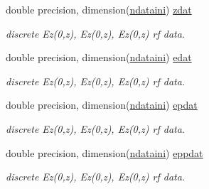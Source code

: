 \textbf{ }\par
\begin{DoxyCompactItemize}
\item 
double precision, dimension(\mbox{\hyperlink{namespacedataclass_a2578bbe9c4dc0892ee08a8619cd7e978}{ndataini}}) \mbox{\hyperlink{namespacedataclass_aeed47a37719b1f84d885a1cb8a962081}{zdat}}
\begin{DoxyCompactList}\small\item\em discrete Ez(0,z), Ez\textquotesingle{}(0,z), Ez\textquotesingle{}\textquotesingle{}(0,z) rf data. \end{DoxyCompactList}\item 
double precision, dimension(\mbox{\hyperlink{namespacedataclass_a2578bbe9c4dc0892ee08a8619cd7e978}{ndataini}}) \mbox{\hyperlink{namespacedataclass_a67357b933079ed021a94705c576fead0}{edat}}
\begin{DoxyCompactList}\small\item\em discrete Ez(0,z), Ez\textquotesingle{}(0,z), Ez\textquotesingle{}\textquotesingle{}(0,z) rf data. \end{DoxyCompactList}\item 
double precision, dimension(\mbox{\hyperlink{namespacedataclass_a2578bbe9c4dc0892ee08a8619cd7e978}{ndataini}}) \mbox{\hyperlink{namespacedataclass_a2f77b697b14f3e0d557f044ea69402d8}{epdat}}
\begin{DoxyCompactList}\small\item\em discrete Ez(0,z), Ez\textquotesingle{}(0,z), Ez\textquotesingle{}\textquotesingle{}(0,z) rf data. \end{DoxyCompactList}\item 
double precision, dimension(\mbox{\hyperlink{namespacedataclass_a2578bbe9c4dc0892ee08a8619cd7e978}{ndataini}}) \mbox{\hyperlink{namespacedataclass_a1c9d30100962693c922470368987ec8a}{eppdat}}
\begin{DoxyCompactList}\small\item\em discrete Ez(0,z), Ez\textquotesingle{}(0,z), Ez\textquotesingle{}\textquotesingle{}(0,z) rf data. \end{DoxyCompactList}\end{DoxyCompactItemize}

